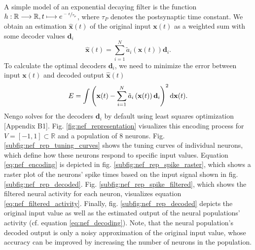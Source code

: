 A simple model of an exponential decaying filter is the function $h: \mathbb{R} \longrightarrow \mathbb{R}, t \longmapsto e^{\sfrac{-t}{\tau_{p}}}$, where $\tau_{P}$ denotes the postsynaptic time constant.
We obtain an estimation $\mathbf{\hat{x}}(t)$ of the original input $\mathbf{x}(t)$ as a weighted sum with some decoder values $\mathbf{d}_{i}$
\begin{equation}
\mathbf{\hat{x}}(t) = \sum_{i=1}^{N} \tilde{a}_{i}\left(\mathbf{x}(t)\right) \mathbf{d}_{i}.
\label{eq:nef_decoding}
\end{equation}
To calculate the optimal decoders $\mathbf{d}_{i}$, we need to minimize the error between input $\mathbf{x}(t)$ and decoded output $\mathbf{\hat{x}}(t)$
\begin{equation}
E = \int \left( \mathbf{x}(t) - \sum_{i=1}^{N} \tilde{a}_{i}\left(\mathbf{x}(t)\right) \mathbf{d}_{i}\right)^{2} \mathop{}\!\mathrm{d} \mathbf{x}(t).
\label{eq:decoder_calculation}
\end{equation}
\ac{Nengo} solves for the decoders $\mathbf{d}_{i}$ by default using least squares optimization \cite{Eliasmith2013}[Appendix B1].
Fig. \ref{fig:nef_representation} visualizes this encoding process for $V = \left[ -1, 1\right] \subset \mathbb{R}$ and a population of $8$ neurons.
Fig. \ref{subfig:nef_rep_tuning_curves} shows the tuning curves of individual neurons, which define how these neurons respond to specific input values.
Equation \ref{eq:nef_encoding} is depicted in fig. \ref{subfig:nef_rep_spike_raster}, which shows a raster plot of the neurons' spike times based on the input signal shown in fig. \ref{subfig:nef_rep_decoded}.
Fig. \ref{subfig:nef_rep_spike_filtered}, which shows the filtered neural activity for each neuron, visualizes equation \ref{eq:nef_filtered_activity}.
Finally, fig. \ref{subfig:nef_rep_decoded} depicts the original input value as well as the estimated output of the neural populations' activity (cf. equation \ref{eq:nef_decoding}).
Note, that the neural population's decoded output is only a noisy approximation of the original input value, whose accuracy can be improved by increasing the number of neurons in the population.
